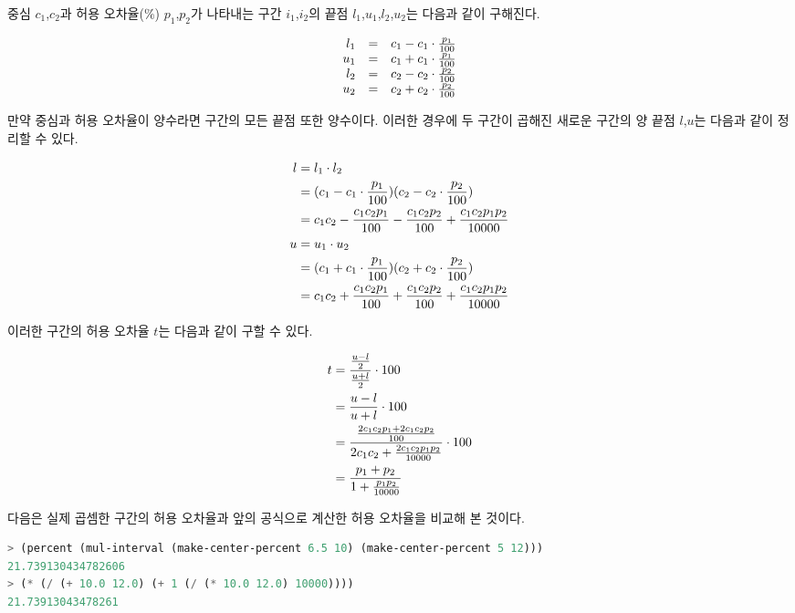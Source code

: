 중심 $c_1$,$c_2$과 허용 오차율($\%$) $p_1$,$p_2$가 나타내는 구간 $i_1$,$i_2$의
끝점 $l_1$,$u_1$,$l_2$,$u_2$는 다음과 같이 구해진다.

\begin{equation}\notag
  \begin{array}{rcl}
    l_1 & = & c_1 - c_1 \cdot \frac{p_1}{100} \\
    u_1 & = & c_1 + c_1 \cdot \frac{p_1}{100} \\
    l_2 & = & c_2 - c_2 \cdot \frac{p_2}{100} \\
    u_2 & = & c_2 + c_2 \cdot \frac{p_2}{100} \\
  \end{array}
\end{equation}

만약 중심과 허용 오차율이 양수라면 구간의 모든 끝점 또한 양수이다. 이러한
경우에 두 구간이 곱해진 새로운 구간의 양 끝점 $l$,$u$는 다음과 같이 정리할 수
있다.

\begin{equation}\notag
  \begin{aligned}
    l & = l_1 \cdot l_2 \\
      & = (c_1 - c_1 \cdot \frac{p_1}{100}) (c_2 - c_2 \cdot \frac{p_2}{100}) \\
      & = c_1c_2 - \frac{c_1c_2p_1}{100} - \frac{c_1c_2p_2}{100} + \frac{c_1c_2p_1p_2}{10000} \\
    u & = u_1 \cdot u_2 \\
      & = (c_1 + c_1 \cdot \frac{p_1}{100}) (c_2 + c_2 \cdot \frac{p_2}{100}) \\
      & = c_1c_2 + \frac{c_1c_2p_1}{100} + \frac{c_1c_2p_2}{100} + \frac{c_1c_2p_1p_2}{10000} \\
  \end{aligned}
\end{equation}

이러한 구간의 허용 오차율 $t$는 다음과 같이 구할 수 있다.

\begin{equation}\notag
  \begin{aligned}
    t & = \frac{\frac{u - l}{2}}{\frac{u + l}{2}} \cdot 100 \\
      & = \frac{u-l}{u+l} \cdot 100 \\
      & = \frac{\frac{2c_1c_2p_1+2c_1c_2p_2}{100}}{2c_1c_2 +
        \frac{2c_1c_2p_1p_2}{10000}} \cdot 100 \\
      & = \frac{p_1+p_2}{1 + \frac{p_1p_2}{10000}} \\
  \end{aligned}
\end{equation}

다음은 실제 곱셈한 구간의 허용 오차율과 앞의 공식으로 계산한 허용 오차율을
비교해 본 것이다.

\begin{lstlisting}[language=Scheme]
> (percent (mul-interval (make-center-percent 6.5 10) (make-center-percent 5 12)))
21.739130434782606
> (* (/ (+ 10.0 12.0) (+ 1 (/ (* 10.0 12.0) 10000))))
21.73913043478261
\end{lstlisting}


